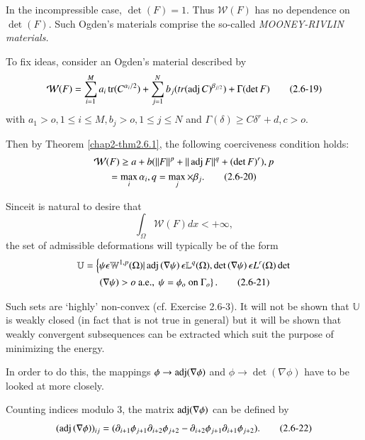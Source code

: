 \begin{remark}\label{chap2-rem2.6.2}%
In the incompressible case, $\det (F)=1$. Thus $\mathcal{W}(F)$ has no
dependence on $\det (F)$. Such Ogden's materials comprise the
so-called {\em MOONEY-RIVLIN materials.}
\end{remark}

To fix ideas, consider an Ogden's material described by
\begin{equation*}
\mathcal{W}(F)=\sum^{M}_{i=1} a_i \operatorname{tr} (C^{\alpha_i/2})+\sum^{N}_{j=1}
b_j(tr(\operatorname{adj}  C)^{\beta_{j/2}})+\Gamma(\det F) \tag{2.6-19} \label{eq2.6-19}
\end{equation*}
with $a_1 > o, 1 \le i \le M, b_j > o, 1 \le j \le N$ and
$\Gamma(\delta)\ge C \delta ^r +d,c>o$. 

Then by Theorem \ref{chap2-thm2.6.1}, the following coerciveness
condition holds: 
\begin{multline*}
\mathcal{W}(F)\ge a+b(|| F ||^p + || \operatorname{adj}  F||^q + (\det F)^r),p\\ 
=\max_i \alpha_i,q=\max_j \times \beta_j. \tag{2.6-20}\label{eq2.6-20} 
\end{multline*}

Since\pageoriginale it is natural to desire that
$$
\int_\Omega \mathcal{W}(F) dx < + \infty,
$$
the set of admissible deformations will typically be of the form
\begin{multline*}
  \mathbb{U}=\left\{\psi \epsilon \mathbb{W}^{1,p}(\Omega) | \operatorname{adj}
  \left(\nabla \psi\right) \epsilon \mathbb{L}^q (\Omega), \det
  \left(\nabla \psi\right) \epsilon L^r(\Omega)
  \det\right.\\ 
  \left. \left(\nabla\psi\right) >o ~\text{a.e.},~\psi = \phi_o
  ~\text{on}~ \Gamma_o\right\}. \tag{2.6-21}  \label{eq2.6-21}
\end{multline*}

Such sets are `highly' non-convex (cf. Exercise 2.6-3). It will not
be shown that $\mathbb{U}$ is weakly closed (in fact that is not true
in general) but it will be shown that weakly convergent subsequences
can be extracted which suit the purpose of minimizing the energy. 

In order to do this, the mappings $\phi \to \operatorname{adj} (\nabla
\phi)$ and $\phi \to \det (\nabla \phi)$ have to be looked
at more closely. 

Counting indices modulo $3$, the matrix $\operatorname{adj}  (\nabla
\phi)$ can be defined by 
\begin{equation*}
(\operatorname{adj} \left(\nabla \phi\right))_{ij}= (\partial_{i+1}
  \phi_{j+1} \partial_{i+2}\phi_{j+2} -\partial_{i+2} \phi_{j+1}
  \partial_{i+1} \phi_{j+2}). \tag{2.6-22} \label{eq2.6-22}
\end{equation*}

